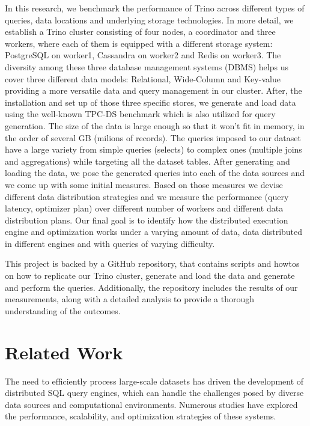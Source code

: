 \documentclass[conference]{IEEEtran}
\begin{document}
In this research, we benchmark the performance of Trino across different types of queries, data locations and underlying
storage technologies. In more detail, we establish a Trino cluster consisting of four nodes, a coordinator and three workers,
where each of them is equipped with a different storage system: PostgreSQL on worker1, Cassandra on worker2 and Redis on worker3.
The diversity among these three database management systems (DBMS) helps us cover three different data models:
Relational, Wide-Column and Key-value providing a more versatile data and query management in our cluster. After, the installation and set up of those three specific stores, we generate and load
data using the well-known TPC-DS \cite{b8} benchmark which is also utilized for query generation.
The size of the data is large enough so that it won't fit in memory, in the order of several GB (milions of records).
The queries imposed to our dataset have a large variety from simple queries (selects) to complex ones (multiple joins and aggregations) while targeting all the dataset tables.
After generating and loading the data, we pose the generated queries into each of the data sources and we come up with some
initial measures. Based on those measures we devise different data distribution strategies and we measure the performance
(query latency, optimizer plan) over different number of workers and different data distribution plans. Our final goal is to
identify how the distributed execution engine and optimization works under a varying amount of data, data distributed in
different engines and with queries of varying difficulty.

This project is backed by a GitHub repository, that contains scripts and howtos on how to replicate our Trino cluster, generate and load the data and
generate and perform the queries. Additionally, the repository includes the results of our measurements, along with a detailed analysis to provide a
thorough understanding of the outcomes.

\section{Related Work}

The need to efficiently process large-scale datasets has driven the development of distributed SQL
query engines, which can handle the challenges posed by diverse data sources and computational
environments. Numerous studies have explored the performance, scalability, and optimization
strategies of these systems.
\end{document}
